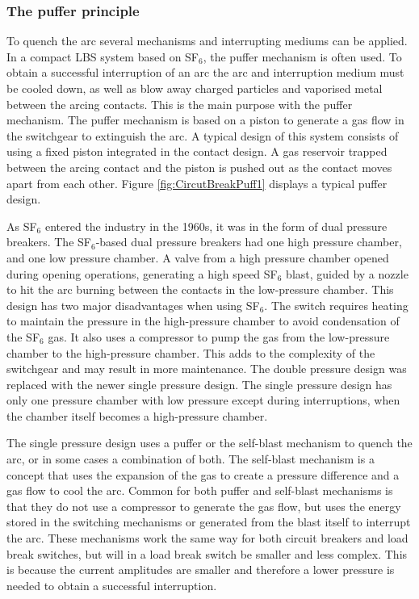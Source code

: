 \documentclass[10pt,a4paper,twoside]{article}
\begin{document}
\subsubsection{The puffer principle}
To quench the arc several mechanisms and interrupting mediums can be applied. In a compact LBS system based on SF$_6$, the puffer mechanism is often used. To obtain a successful interruption of an arc the arc and interruption medium must be cooled down, as well as blow away charged particles and vaporised metal between the arcing contacts. This is the main purpose with the puffer mechanism. The puffer mechanism is based on a piston to generate a gas flow in the switchgear to extinguish the arc. A typical design of this system consists of using a fixed piston integrated in the contact design. A gas reservoir trapped between the arcing contact and the piston is pushed out as the contact moves apart from each other. Figure \ref{fig:CircutBreakPuff1} displays a typical puffer design.

As SF$_6$ entered the industry in the 1960s, it was in the form of dual pressure breakers. The SF$_6$-based dual pressure breakers had one high pressure chamber, and one low pressure chamber. A valve from a high pressure chamber opened during opening operations, generating a high speed SF$_6$ blast, guided by a nozzle to hit the arc burning between the contacts in the low-pressure chamber. This design has two major disadvantages when using SF$_6$. The switch requires heating to maintain the pressure in the high-pressure chamber to avoid condensation of the SF$_6$ gas. It also uses a compressor to pump the gas from the low-pressure chamber to the high-pressure chamber. This adds to the complexity of the switchgear and may result in more maintenance. The double pressure design was replaced with the newer single pressure design. The single pressure design has only one pressure chamber with low pressure except during interruptions, when the chamber itself becomes a high-pressure chamber.

The single pressure design uses a puffer or the self-blast mechanism to quench the arc, or in some cases a combination of both. The self-blast mechanism is a concept that uses the expansion of the gas to create a pressure difference and a gas flow to cool the arc. Common for both puffer and self-blast mechanisms is that they do not use a compressor to generate the gas flow, but uses the energy stored in the switching mechanisms or generated from the blast itself to interrupt the arc. These mechanisms work the same way for both circuit breakers and load break switches, but will in a load break switch be smaller and less complex. This is because the current amplitudes are smaller and therefore a lower pressure is needed to obtain a successful interruption.
\end{document}
